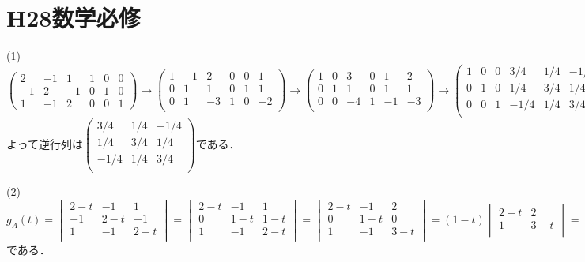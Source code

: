 \documentclass[
		book,
		head_space=20mm,
		foot_space=20mm,
		gutter=10mm,
		line_length=190mm
]{jlreq}
\begin{document}
\section{H28数学必修}
(1)$\begin{pmatrix}
    2 & -1 & 1 & 1 & 0 & 0 \\
    -1 & 2 & -1  & 0 & 1 & 0 \\
    1 & -1 & 2 & 0 & 0 & 1
\end{pmatrix}\to \begin{pmatrix}
    1 & -1 & 2 & 0 & 0 & 1 \\
    0 & 1 & 1  & 0 & 1 & 1 \\
    0 & 1 & -3 & 1 & 0 & -2 \\
\end{pmatrix}\to \begin{pmatrix}
    1 & 0 & 3 & 0 & 1 & 2 \\
    0 & 1 & 1  & 0 & 1 & 1 \\
    0 & 0 & -4 & 1 & -1 & -3 \\
\end{pmatrix}\to \begin{pmatrix}
    1 & 0 & 0 & 3/4 & 1/4 & -1/4 \\
    0 & 1 & 0  & 1/4 & 3/4 & 1/4 \\
    0 & 0 & 1 & -1/4 & 1/4 & 3/4 \\
\end{pmatrix}$よって逆行列は$\begin{pmatrix}
    3/4 & 1/4 & -1/4 \\
    1/4 & 3/4 & 1/4 \\
    -1/4 & 1/4 & 3/4 \\
\end{pmatrix}$である．

(2)$g_A(t)=\begin{vmatrix}
    2-t & -1 & 1  \\
    -1 & 2-t & -1   \\
    1 & -1 & 2-t \\
\end{vmatrix}=\begin{vmatrix}
    2-t & -1 & 1  \\
    0 & 1-t & 1-t   \\
    1 & -1 & 2-t \\
\end{vmatrix}=\begin{vmatrix}
    2-t & -1 & 2  \\
    0 & 1-t & 0   \\
    1 & -1 & 3-t \\
\end{vmatrix}=(1-t)\begin{vmatrix}
    2-t & 2 \\
    1 & 3-t \\
\end{vmatrix}=(1-t)((2-t)(3-t)-2)=-(t-1)^2(t-4)$である．
\end{document}
